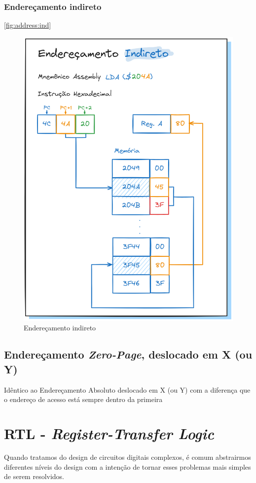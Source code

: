 \documentclass[
	12pt,				  %
	openright,		%
	a4paper,			%
	english,			%
	french,				%
	spanish,			%
	brazil,				%
]{abntex2}
\begin{document}
\subsubsection{Endereçamento indireto}
\autoref{fig:address:ind}
\begin{figure}[H]
	\centering
	\caption{Endereçamento indireto} \label{fig:address:ind}
	\includegraphics[scale=0.25]{../assets/img/addressing-modes-ind.png}
\end{figure}

\subsection{Endereçamento \emph{Zero-Page}, deslocado em X (ou Y)}
Idêntico ao Endereçamento Absoluto deslocado em X (ou Y) com a diferença que o
endereço de acesso está sempre dentro da primeira

\section{RTL - \emph{Register-Transfer Logic}}
Quando tratamos do design de circuitos digitais complexos, é comum abstrairmos
diferentes níveis do design com a intenção de tornar esses problemas mais
simples de serem resolvidos.
\end{document}
